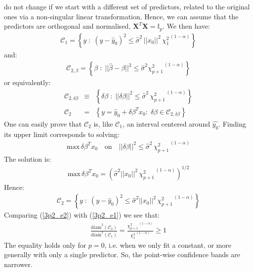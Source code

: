 do not change if we start with a different set of predictors, related to the original ones via a non-singular linear
transformation. Hence, we can assume that the predictors are orthogonal and normalised, $ \mathbf{X}^T \mathbf{X} = \mathbb{I}_p$. We then have:
\begin{eqnarray}\label{3p2_e1}
\mathcal{C}_1 = \left\{ y\; : \; (y - \hat{y}_0)^2 \leq \hat{\sigma}^2\, ||x_0||^2\, {\chi_{1}^2} ^{\,(1- \alpha)} \right\}
\end{eqnarray}
and:
\begin{eqnarray*}
\mathcal{C}_{2, \beta} = \left\{ \beta \; : \; || \hat{\beta} - \beta ||^2 \leq \hat{\sigma}^2 {\chi_{p + 1}^2} ^{\,(1- \alpha)} \right\}
\end{eqnarray*}
or equivalently:
\begin{eqnarray*}
	\mathcal{C}_{2, \delta \beta} & \equiv & \left\{ \delta \beta \; : \; || \delta \beta || ^2 \leq  \hat{\sigma}^2 \, {\chi_{p + 1}^2} ^{\,(1- \alpha)} \right\} \\
\mathcal{C}_2 & = & \left\{ y = \hat{y}_0 + \delta \beta^T x_0: \; \delta \beta \in \mathcal{C}_{2, \delta \beta} \right\} 
\end{eqnarray*}
One can easily prove that $\mathcal{C}_2$ is, like $\mathcal{C}_1$, an interval centered around $\hat{y_0}$. Finding its upper limit corresponds to solving:
\begin{eqnarray*}
\textrm{max} \, \delta \beta^T x_0 \quad \textrm{on} \quad || \delta \beta || ^2 \leq  \hat{\sigma}^2 \, {\chi_{p + 1}^2}^{\,(1- \alpha)}
\end{eqnarray*}
The solution is:
\begin{eqnarray*}
\textrm{max} \, \delta \beta^T x_0 = \left(  \hat{\sigma}^2 ||x_0||^2 \, {\chi_{p + 1}^2}^{\,(1- \alpha)}  \right) ^{1/2}
\end{eqnarray*}
Hence:
\begin{eqnarray} \label{3p2_e2}
\mathcal{C}_2 = \left\{ y \; : \; (y - \hat{y}_0)^2 \leq \hat{\sigma}^2 ||x_0||^2 \, {\chi_{p + 1}^2}^{\,(1- \alpha)} \right\}
\end{eqnarray}
Comparing (\ref{3p2_e2}) with (\ref{3p2_e1}) we see that:
\begin{eqnarray}
\frac{\textrm{diam}^2(\mathcal{C}_2)}{\textrm{diam}^2(\mathcal{C}_1)} = \frac{{\chi_{p + 1}^2}^{\,(1- \alpha)}}{{\chi_{1}^2}^{\,(1- \alpha)}} \geq 1
\end{eqnarray}
The equality holds only for $p = 0$, i.e. when we only fit a constant, or more generally with only a single predictor. So, the point-wise confidence bands are narrower.


